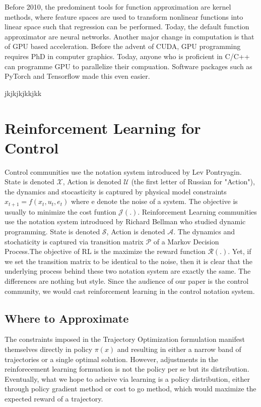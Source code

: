 \documentclass[journal]{IEEEtran}
\begin{document}
Before 2010, the predominent tools for function approximation are kernel methods, where feature spaces are used to transform nonlinear functions into linear space such that regression can be performed. Today, the default function approximator are neural networks. Another major change in computation is that of GPU based acceleration. Before the advent of CUDA, GPU programming requires PhD in computer graphics. Today, anyone who is proficient in C/C++ can programme GPU to parallelize their compuation. Software packages such as PyTorch and Tensorflow made this even easier.

jkjkjkjkkjkk




\section{Reinforcement Learning for Control}
Control communities use the notation system introduced by Lev Pontryagin. State is denoted $ \mathcal{X}$, Action is denoted $\mathcal{U}$ (the first letter of Russian for "Action"), the dynamics and stocasticity is captured by physical model constraints $x_{t+1}=f(x_t,u_t,e_t)$ where e denote the noise of a system. The objective is usually to minimize the cost funtion $\mathcal{J(.)}$. Reinforcement Learning communities use the notation system introduced by Richard Bellman who studied dynamic programming. State is denoted $\mathcal{S}$, Action is denoted $\mathcal{A}$. The dynamics and stochaticity is captured via transition matrix $\mathcal{P}$ of a Markov Decision Process.The objective of RL is the maximize the reward function $\mathcal{R(.)}$. Yet, if we set the transition matrix to be identical to the noise, then it is clear that the underlying process behind these two notation system are exactly the same. The differences are nothing but style. Since the audience of our paper is the control community, we would cast reinforcement learning in the control notation system.

\subsection{Where to Approximate}
The constraints imposed in the Trajectory Optimization formulation manifest themselves directly in policy $\pi(x)$ and resulting in either a narrow band of trajectories or a single optimal solution. However, adjustments in the reinforecement learning formuation is not the policy per se but its distribution. Eventually, what we hope to acheive via learning is a policy distribution, either through policy gradient method or cost to go method, which would maximize the expected reward of a trajectory.
\end{document}
